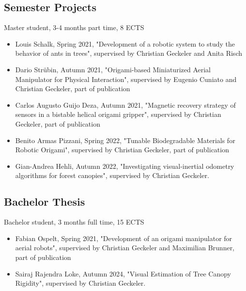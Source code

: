 \subsection{Semester Projects}
Master student, 3-4 months part time, 8 ECTS
\begin{itemize}
    \item Louis Schalk, Spring 2021, "Development of a robotic system to study the behavior of ants in trees", supervised by Christian Geckeler and Anita Risch

    \item Dario Strübin, Autumn 2021, "Origami-based Miniaturized Aerial Manipulator for Physical Interaction", supervised by Eugenio Cuniato and Christian Geckeler, part of publication \cite{Cuniato2023DesignManipulator}

    \item Carlos Augusto Guijo Deza, Autumn 2021, "Magnetic recovery strategy of sensors in a bistable helical origami gripper", supervised by Christian Geckeler, part of publication \cite{Geckeler2022a}

    \item Benito Armas Pizzani, Spring 2022, "Tunable Biodegradable Materials for Robotic Origami", supervised by Christian Geckeler, part of publication \cite{Geckeler2023b}

    \item Gian-Andrea Hehli, Autumn 2022, "Investigating visual-inertial odometry algorithms for forest canopies", supervised by Christian Geckeler.
\end{itemize}

\subsection{Bachelor Thesis}
Bachelor student, 3 months full time, 15 ECTS %

\begin{itemize}
  \item Fabian Ospelt, Spring 2021, "Development of an origami manipulator for aerial robots", supervised by Christian Geckeler and Maximilian Brunner, part of publication \cite{Cuniato2023DesignManipulator}

  \item Sairaj Rajendra Loke, Autumn 2024, "Visual Estimation of Tree Canopy Rigidity", supervised by Christian Geckeler.
\end{itemize}



